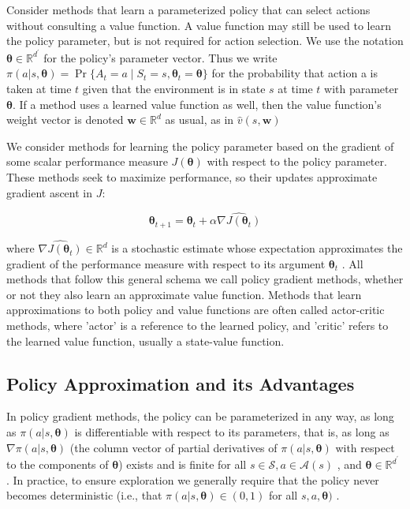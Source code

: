 \documentclass{article}
\begin{document}
Consider methods that learn a parameterized policy that can select actions without consulting a value function. 
A value function may still be used to learn the policy parameter, but is not required for action selection. We use the notation $\pmb { \theta } \in \mathbb { R } ^ { d ^ { \prime } }$ for the policy's parameter vector. 
Thus we write $\pi ( a | s , \pmb { \theta } ) = \operatorname* { P r } \{ A _ { t }   =   a \mid S _ { t }   =   s , \pmb { \theta } _ { t }   =   \pmb { \theta } \}$ for the probability that action a is taken at time $t$ 
given that the environment is in state $s$ at time $t$ with parameter $\pmb { \theta }$. If a method uses a learned value function as well, then the value function's weight vector is denoted $\mathbf { w } \in \mathbb { R } ^ { d }$ as usual, 
as in $\hat { v } ( s , \mathbf { w } )$

We consider methods for learning the policy parameter based on the gradient of some scalar performance measure $J ( \pmb { \theta } )$ with respect to the policy parameter. These methods seek to maximize performance, 
so their updates approximate gradient ascent in $J$:

$$
\pmb { \theta } _ { t + 1 } = \pmb { \theta } _ { t } + \alpha \widehat { \nabla J ( \pmb { \theta } _ { t } ) }
$$

where $\widehat { \nabla J ( \pmb { \theta } _ { t } ) } \in \mathbb { R } ^ { d }$ is a stochastic estimate whose expectation approximates the gradient of the performance measure with respect to its argument $\pmb { \theta } _ { t }$ . 
All methods that follow this general schema we call policy gradient methods, whether or not they also learn an approximate value function. Methods that learn approximations to both policy and value functions are often called actor-critic methods, 
where 'actor' is a reference to the learned policy, and 'critic' refers to the learned value function, usually a state-value function.

\subsection{Policy Approximation and its Advantages}

In policy gradient methods, the policy can be parameterized in any way, as long as $\pi ( a | s , \pmb { \theta } )$ is differentiable with respect to its parameters, that is, as long as $\nabla \pi ( a | s , \pmb { \theta } )$ 
(the column vector of partial derivatives of $\pi ( a | s , \pmb { \theta } )$ with respect to the components of $\pmb { \theta }$) exists and is finite for all $s \in \mathcal { S } ,   a \in \mathcal { A } ( s )$ , and $\pmb { \theta } \in \mathbb { R } ^ { d ^ { \prime } }$ . 
In practice, to ensure exploration we generally require that the policy never becomes deterministic (i.e., that $\pi ( a | s , \pmb { \theta } ) \in ( 0 , 1 )$ for all $s , a , \pmb { \theta } )$ .
\end{document}

